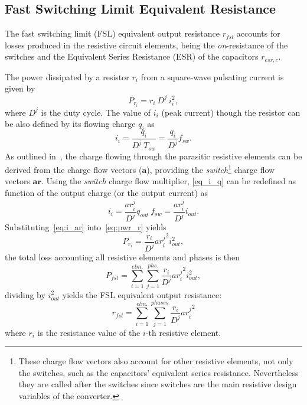 \subsection[FSL Equivalent Resistance]{Fast Switching Limit Equivalent Resistance}
The fast switching limit (FSL) equivalent output resistance $r_{fsl}$ accounts for losses produced in the resistive circuit elements, being the \emph{on}-resistance of the switches and the Equivalent Series Resistance (ESR) of the capacitors $r_{esr,c}$.

The power dissipated by a resistor $r_i$ from a square-wave pulsating current is given by
\begin{equation}
P_{r_i} = r_i~D^j~i_i^2,
\label{eq:pwr_r}
\end{equation}
where $D^j$ is the duty cycle. The value of $i_i$ (peak current) though the resistor can be also defined by its flowing charge $q_i$ as
\begin{equation}
i_i = \frac{q_i}{D^j~T_{sw}} = \frac{q_i}{D^j} f_{sw}.
\label{eq:i_q}
\end{equation}
As outlined in~\cite{Seeman:EECS-2009-78}, the charge flowing through the parasitic resistive elements can be derived from the charge flow vectors ($\mathbf{a}$), providing the \emph{switch}\footnote{These charge flow vectors also account for other resistive elements, not only the switches, such as the capacitors' equivalent series resistance. Nevertheless they are called after the switches since switches are the main resistive design variables of the converter.} charge flow vectors $\mathbf{ar}$. Using the \emph{switch} charge flow multiplier, \eqref{eq_i_q} can be redefined as function of the output charge (or the output current) as
\begin{equation}
i_i = \frac{ar_i^j}{D^j} q_{out}~f_{sw} = \frac{ar_i^j}{D^j} i_{out}.
\label{eq:i_ar}
\end{equation}
Substituting~\eqref{eq:i_ar} into~\eqref{eq:pwr_r} yields
\begin{equation}
P_{r_i} = \frac{r_i}{D^j}{ar_i^j}^2 i_{out}^2 ,
\label{eq:pwr_r_ar}
\end{equation}
the total loss accounting all resistive elements and phases is then
\begin{equation}
P_{fsl} = \sum_{i=1}^{elm.} \sum_{j=1}^{phs.}  \frac{r_i}{D^j}{ar_i^j}^2 i_{out}^2,
\label{eq:pwr_fsl}
\end{equation}
dividing by $i_{out}^2$ yields the FSL equivalent output resistance:
\begin{equation}
r_{fsl}=\sum_{i=1}^{elm.}\sum_{j=1}^{phases}\frac{r_i}{D^j}{ar_i^j}^2
\label{eq:r_fsl}
\end{equation}
where $r_i$ is the resistance value of the $i$-th resistive element.


